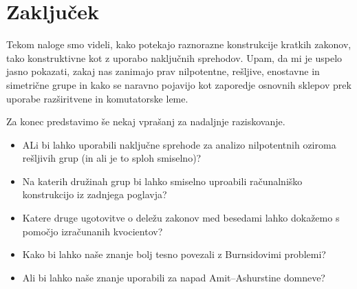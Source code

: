 \section{Zaključek}

Tekom naloge smo videli, kako potekajo raznorazne konstrukcije kratkih zakonov, tako konstruktivne kot z uporabo naključnih sprehodov.
Upam, da mi je uspelo jasno pokazati, zakaj nas zanimajo prav nilpotentne, rešljive, enostavne in simetrične grupe in kako se naravno pojavijo
kot zaporedje osnovnih sklepov prek uporabe razširitvene in komutatorske leme.

Za konec predstavimo še nekaj vprašanj za nadaljnje raziskovanje. \begin{itemize}
    \item ALi bi lahko uporabili naključne sprehode za analizo nilpotentnih oziroma rešljivih grup (in ali je to sploh smiselno)?
    \item Na katerih družinah grup bi lahko smiselno uproabili računalniško konstrukcijo iz zadnjega poglavja?
    \item Katere druge ugotovitve o deležu zakonov med besedami lahko dokažemo s pomočjo izračunanih kvocientov?
    \item Kako bi lahko naše znanje bolj tesno povezali z Burnsidovimi problemi?
    \item Ali bi lahko naše znanje uporabili za napad Amit–Ashurstine domneve?
\end{itemize}